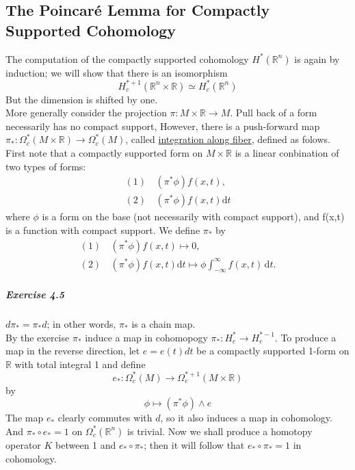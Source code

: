 \documentclass{article}
\begin{document}
\subsection{The Poincar\'{e} Lemma for Compactly Supported Cohomology}
The computation of the compactly supported cohomology  $ H^*(\mathbb{R }^n ) $ is again by induction; we will show that there is an isomorphism\[H^{*+1}_c(\mathbb{R }^n\times\mathbb{R })\simeq H^*_c(\mathbb{R}^n)\]
But the dimension is shifted by one.\\
\qquad More generally consider the projection  $ \pi:M\times \mathbb{R }\rightarrow M  $. Pull back of a form necessarily has no compact support, However, there is  a push-forward map  $ \pi_*:\Omega_c^*(M\times\mathbb{R })\rightarrow \Omega_c^*(M) $, called \underline{integration along fiber}, defined as folows.\\
First note that a compactly supported form on  $ M\times\mathbb{R } $ is a linear conbination of two types of forms:
\begin{align*}
    (1)\,&(\pi^*\phi)f(x,t),\\
    (2)\,&(\pi^*\phi)f(x,t)\mathrm{d}t
\end{align*} 
where  $ \phi $ is a form on the base (not necessarily with compact support), and f(x,t) is a function with compact support. We define  $ \pi_* $ by
\begin{equation}\tag{4.4}
    \begin{aligned}
        (1)\,&(\pi^*\phi)f(x,t)\mapsto0,\\
        (2)\,&(\pi^*\phi)f(x,t)\mathrm{d} t\mapsto\phi\int_{-\infty}^{\infty}f(x,t)\,\mathrm{d}t.
    \end{aligned}  
\end{equation}
\subparagraph{Exercise 4.5} $ d\pi_*=\pi_*d $; in other words,  $ \pi_*  $ is a chain map.\\
By the exercise  $ \pi_* $  induce a map in cohomopogy  $ \pi_*:H_c^*\rightarrow H_c^{*-1} $.
To produce a map in the reverse direction, let  $ e=e(t)dt $ be a compactly supported 1-form on  $ \mathbb{R } $ with total integral 1 and define\[e_*:\Omega_c^*(M )\rightarrow \Omega_c^{*+1}(M\times \mathbb{R})\]
by\[\phi\mapsto(\pi^*\phi)\wedge e\]  
The map  $ e_* $ clearly commutes with  $ d  $, so it also induces a map in cohomology. And  $ \pi_*\circ e_*=1 $ on  $ \Omega_c^*(\mathbb{R}^n) $ is trivial. Now we shall produce a homotopy operator  $ K  $ between 1 and  $ e_*\circ\pi_* $; then it will follow that   $  e_*\circ\pi_*=1 $ in cohomology.\\
\end{document}
